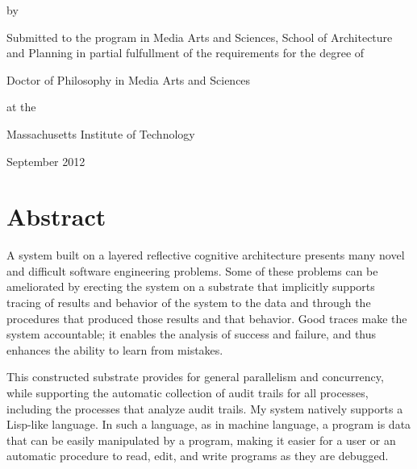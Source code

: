 \begingroup
\let\clearpage\relax
\let\cleardoublepage\relax
\let\cleardoublepage\relax

\begin{center}
    \begingroup
        \color{Maroon}
        {\Large\textsc{\myTitle}}
    \endgroup

    by

    \myName

    \vspace{4mm}

 Submitted to the program in Media Arts and Sciences, School of
 Architecture and Planning in partial fulfullment of the requirements
 for the degree of

    \vspace{2mm}

Doctor of Philosophy in Media Arts and Sciences

at the

Massachusetts Institute of Technology

    \vspace{2mm}

September 2012

\vspace{-4mm}

\end{center}


\chapter*{Abstract}

A system built on a layered reflective cognitive architecture presents
many novel and difficult software engineering problems.  Some of these
problems can be ameliorated by erecting the system on a substrate that
implicitly supports tracing of results and behavior of the system to
the data and through the procedures that produced those results and
that behavior.  Good traces make the system accountable; it enables
the analysis of success and failure, and thus enhances the ability to
learn from mistakes.

This constructed substrate provides for general parallelism and
concurrency, while supporting the automatic collection of audit trails
for all processes, including the processes that analyze audit trails.
My system natively supports a Lisp-like language.  In such a language,
as in machine language, a program is data that can be easily
manipulated by a program, making it easier for a user or an automatic
procedure to read, edit, and write programs as they are debugged.

